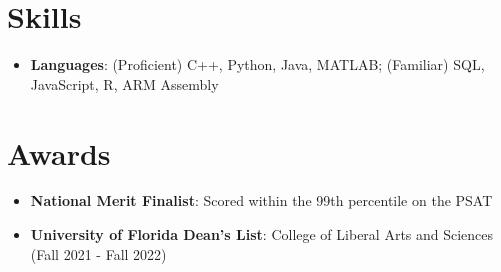 \documentclass[letterpaper,11pt]{article}
\newcommand{\resumeItemSkills}[2]{
  \item\normalsize{
    \textbf{#1}{: #2 \vspace{-2pt}}
  }
}
\newcommand{\resumeSubItemSkills}[2]{\resumeItemSkills{#1}{#2}\vspace{-4pt}}
\newcommand{\resumeSubHeadingListStartSkillsAwards}{\begin{itemize}[leftmargin=*]}
\newcommand{\resumeSubHeadingListEnd}{\end{itemize}}
\begin{document}
\section{Skills}
 \resumeSubHeadingListStartSkillsAwards
   \resumeSubItemSkills{Languages}{(Proficient) C++, Python, Java, MATLAB; (Familiar) SQL, JavaScript, R, ARM Assembly}
 \resumeSubHeadingListEnd

\section{Awards}
  \resumeSubHeadingListStartSkillsAwards
    \resumeSubItemSkills{National Merit Finalist}
      {Scored within the 99th percentile on the PSAT}
    \resumeSubItemSkills{University of Florida Dean's List}
      {College of Liberal Arts and Sciences (Fall 2021 - Fall 2022)}
  \resumeSubHeadingListEnd
  
\end{document}
